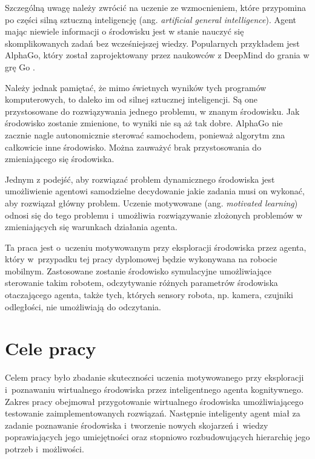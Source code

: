 Szczególną uwagę należy zwrócić na uczenie ze wzmocnieniem, które przypomina po 
części silną sztuczną inteligencję (ang. \textit{artificial general 
intelligence}). Agent mając niewiele informacji o środowisku jest w stanie 
nauczyć się skomplikowanych zadań bez wcześniejszej wiedzy. Popularnych 
przykładem jest AlphaGo, który został zaprojektowany przez naukowców z DeepMind 
do grania w grę Go \cite{alphago_deepmind}.

Należy jednak pamiętać, że mimo świetnych wyników tych programów komputerowych, 
to daleko im od silnej sztucznej inteligencji. Są one przystosowane do 
rozwiązywania jednego problemu, w znanym środowisku. Jak środowisko zostanie 
zmienione, to wyniki nie są aż tak dobre. AlphaGo nie zacznie nagle 
autonomicznie sterować samochodem, ponieważ algorytm zna całkowicie inne 
środowisko. Można zauważyć brak przystosowania do zmieniającego się środowiska.

Jednym z podejść, aby rozwiązać problem dynamicznego środowiska jest 
umożliwienie agentowi samodzielne decydowanie jakie zadania musi on wykonać, 
aby rozwiązał główny problem. Uczenie motywowane (ang. \textit{motivated 
learning}) odnosi się do tego problemu i~umożliwia rozwiązywanie złożonych 
problemów w zmieniających się warunkach działania agenta.


Ta praca jest o~uczeniu motywowanym przy eksploracji środowiska przez agenta, 
który w~przypadku tej pracy dyplomowej będzie wykonywana na robocie mobilnym. 
Zastosowane zostanie środowisko symulacyjne umożliwiające sterowanie takim 
robotem, odczytywanie różnych parametrów środowiska otaczającego agenta, 
także tych, których sensory robota, np. kamera, czujniki odległości, nie 
umożliwiają do odczytania.


\section{Cele pracy}
\label{sec:cele_pracy}

Celem pracy było zbadanie skuteczności uczenia motywowanego przy eksploracji 
i~poznawaniu wirtualnego środowiska przez inteligentnego agenta kognitywnego. 
Zakres pracy obejmował przygotowanie wirtualnego środowiska umożliwiającego 
testowanie zaimplementowanych rozwiązań. Następnie inteligenty agent miał za 
zadanie poznawanie środowiska i~tworzenie nowych skojarzeń i~wiedzy 
poprawiających jego umiejętności oraz stopniowo rozbudowujących hierarchię jego 
potrzeb i~możliwości. 

